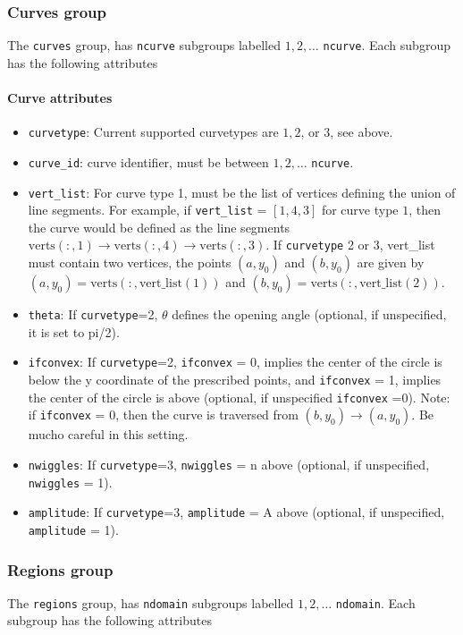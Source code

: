 \documentclass[11pt]{article}
\theoremstyle{definition}
\theoremstyle{remark}
\numberwithin{equation}{section}
\begin{document}
\subsubsection{Curves group}
The \texttt{curves} group, has \texttt{ncurve} subgroups labelled $1,2, \ldots$ \texttt{ncurve}. Each subgroup has the following attributes
\paragraph{Curve attributes}
\begin{itemize}
\item \texttt{curvetype}: Current supported curvetypes are $1,2$, or $3$, see above.
\item \texttt{curve\_id}: curve identifier, must be between $1,2,\ldots$ \texttt{ncurve}.
\item \texttt{vert\_list}: For curve type 1, must be the list of vertices defining the union of line segments. For example, if \texttt{vert\_list} = $[1,4,3]$ for curve type $1$, then the curve would be defined as the line segments $\textrm{verts}(:,1)\to \textrm{verts}(:,4) \to \textrm{verts}(:,3)$. If \texttt{curvetype} 2 or 3, vert\_list must contain two vertices, the points $(a,y_{0})$ and $(b,y_{0})$ are given by $(a,y_{0})=\textrm{verts}(:,\textrm{vert\_list}(1))$ and $(b,y_0)=\textrm{verts}(:,\textrm{vert\_list}(2))$.
\item \texttt{theta}: If \texttt{curvetype}=2, $\theta$ defines the opening angle (optional, if unspecified, it is set to pi/2).
\item \texttt{ifconvex}: If \texttt{curvetype}=2, \texttt{ifconvex} = 0, implies the center of the circle is below the y coordinate of the prescribed points, and \texttt{ifconvex} = 1, implies the center of the circle is above (optional, if unspecified \texttt{ifconvex} =0). {\color{red} Note: if \texttt{ifconvex} = 0, then the curve is traversed from $(b,y_{0}) \to (a,y_{0})$. Be mucho careful in this setting.}
\item \texttt{nwiggles}: If \texttt{curvetype}=3, \texttt{nwiggles} = n above (optional, if unspecified, \texttt{nwiggles} = 1).
\item \texttt{amplitude}: If \texttt{curvetype}=3, \texttt{amplitude} = A above (optional, if unspecified, \texttt{amplitude} = 1).
\end{itemize}

\subsubsection{Regions group}
The \texttt{regions} group, has \texttt{ndomain} subgroups labelled $1,2,\ldots $ \texttt{ndomain}. Each subgroup has the following attributes
\end{document}
